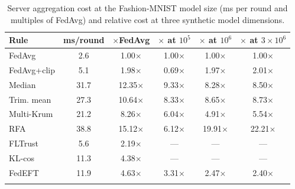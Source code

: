 \begin{table}[!tbp]
\centering
\caption{Server aggregation cost at the Fashion-MNIST model size (ms per round and multiples of FedAvg) and relative cost at three synthetic model dimensions.}
\label{tab:cost}
\setlength{\tabcolsep}{4.5pt}
\footnotesize
\begin{tabular}{@{}lccccc@{}}
\toprule
Rule & ms/round & $\times$FedAvg & $\times$ at $10^{5}$ & $\times$ at $10^{6}$ & $\times$ at $3\!\times\!10^{6}$\\
\midrule
FedAvg & 2.6 & 1.00$\times$ & 1.00$\times$ & 1.00$\times$ & 1.00$\times$\\
FedAvg+clip & 5.1 & 1.98$\times$ & 0.69$\times$ & 1.97$\times$ & 2.01$\times$\\
Median & 31.7 & 12.35$\times$ & 9.33$\times$ & 8.28$\times$ & 8.50$\times$\\
Trim. mean & 27.3 & 10.64$\times$ & 8.33$\times$ & 8.65$\times$ & 8.73$\times$\\
Multi-Krum & 21.2 & 8.26$\times$ & 6.04$\times$ & 4.91$\times$ & 5.54$\times$\\
RFA & 38.8 & 15.12$\times$ & 6.12$\times$ & 19.91$\times$ & 22.21$\times$\\
FLTrust & 5.6 & 2.19$\times$ & --- & --- & ---\\
KL-cos & 11.3 & 4.38$\times$ & --- & --- & ---\\
\midrule
FedEFT  & 11.9 & 4.63$\times$ & 3.31$\times$ & 2.47$\times$ & 2.40$\times$\\
\botrule
\end{tabular}
\end{table}
